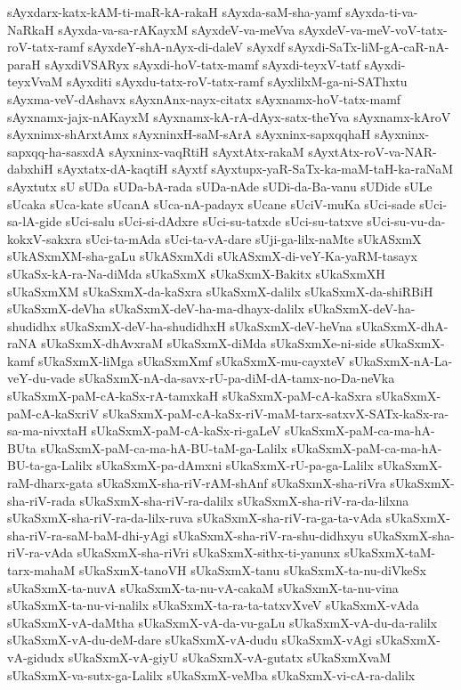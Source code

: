 {sAyxdarx-katx-kAM-ti-maR-kA-rakaH
sAyxda-saM-sha-yamf
sAyxda-ti-va-NaRkaH
sAyxda-va-sa-rAKayxM
sAyxdeV-va-meVva
sAyxdeV-va-meV-voV-tatx-roV-tatx-ramf
sAyxdeY-shA-nAyx-di-daleV
sAyxdf
sAyxdi-SaTx-liM-gA-caR-nA-paraH
sAyxdiVSARyx
sAyxdi-hoV-tatx-mamf
sAyxdi-teyxV-tatf
sAyxdi-teyxVvaM
sAyxditi
sAyxdu-tatx-roV-tatx-ramf
sAyxlilxM-ga-ni-SAThxtu
sAyxma-veV-dAshavx
sAyxnAnx-nayx-citatx
sAyxnamx-hoV-tatx-mamf
sAyxnamx-jajx-nAKayxM
sAyxnamx-kA-rA-dAyx-satx-theYva
sAyxnamx-kAroV
sAyxnimx-shArxtAmx
sAyxninxH-saM-sArA
sAyxninx-sapxqqhaH
sAyxninx-sapxqq-ha-sasxdA
sAyxninx-vaqRtiH
sAyxtAtx-rakaM
sAyxtAtx-roV-va-NAR-dabxhiH
sAyxtatx-dA-kaqtiH
sAyxtf
sAyxtupx-yaR-SaTx-ka-maM-taH-ka-raNaM
sAyxtutx
sU
sUDa
sUDa-bA-rada
sUDa-nAde
sUDi-da-Ba-vanu
sUDide
sULe
sUcaka
sUca-kate
sUcanA
sUca-nA-padayx
sUcane
sUciV-muKa
sUci-sade
sUci-sa-lA-gide
sUci-salu
sUci-si-dAdxre
sUci-su-tatxde
sUci-su-tatxve
sUci-su-vu-da-kokxV-sakxra
sUci-ta-mAda
sUci-ta-vA-dare
sUji-ga-lilx-naMte
sUkASxmX
sUkASxmXM-sha-gaLu
sUkASxmXdi
sUkASxmX-di-veY-Ka-yaRM-tasayx
sUkaSx-kA-ra-Na-diMda
sUkaSxmX
sUkaSxmX-Bakitx
sUkaSxmXH
sUkaSxmXM
sUkaSxmX-da-kaSxra
sUkaSxmX-dalilx
sUkaSxmX-da-shiRBiH
sUkaSxmX-deVha
sUkaSxmX-deV-ha-ma-dhayx-dalilx
sUkaSxmX-deV-ha-shudidhx
sUkaSxmX-deV-ha-shudidhxH
sUkaSxmX-deV-heVna
sUkaSxmX-dhA-raNA
sUkaSxmX-dhAvxraM
sUkaSxmX-diMda
sUkaSxmXe-ni-side
sUkaSxmX-kamf
sUkaSxmX-liMga
sUkaSxmXmf
sUkaSxmX-mu-cayxteV
sUkaSxmX-nA-La-veY-du-vade
sUkaSxmX-nA-da-savx-rU-pa-diM-dA-tamx-no-Da-neVka
sUkaSxmX-paM-cA-kaSx-rA-tamxkaH
sUkaSxmX-paM-cA-kaSxra
sUkaSxmX-paM-cA-kaSxriV
sUkaSxmX-paM-cA-kaSx-riV-maM-tarx-satxvX-SATx-kaSx-ra-sa-ma-nivxtaH
sUkaSxmX-paM-cA-kaSx-ri-gaLeV
sUkaSxmX-paM-ca-ma-hA-BUta
sUkaSxmX-paM-ca-ma-hA-BU-taM-ga-Lalilx
sUkaSxmX-paM-ca-ma-hA-BU-ta-ga-Lalilx
sUkaSxmX-pa-dAmxni
sUkaSxmX-rU-pa-ga-Lalilx
sUkaSxmX-raM-dharx-gata
sUkaSxmX-sha-riV-rAM-shAnf
sUkaSxmX-sha-riVra
sUkaSxmX-sha-riV-rada
sUkaSxmX-sha-riV-ra-dalilx
sUkaSxmX-sha-riV-ra-da-lilxna
sUkaSxmX-sha-riV-ra-da-lilx-ruva
sUkaSxmX-sha-riV-ra-ga-ta-vAda
sUkaSxmX-sha-riV-ra-saM-baM-dhi-yAgi
sUkaSxmX-sha-riV-ra-shu-didhxyu
sUkaSxmX-sha-riV-ra-vAda
sUkaSxmX-sha-riVri
sUkaSxmX-sithx-ti-yanunx
sUkaSxmX-taM-tarx-mahaM
sUkaSxmX-tanoVH
sUkaSxmX-tanu
sUkaSxmX-ta-nu-diVkeSx
sUkaSxmX-ta-nuvA
sUkaSxmX-ta-nu-vA-cakaM
sUkaSxmX-ta-nu-vina
sUkaSxmX-ta-nu-vi-nalilx
sUkaSxmX-ta-ra-ta-tatxvXveV
sUkaSxmX-vAda
sUkaSxmX-vA-daMtha
sUkaSxmX-vA-da-vu-gaLu
sUkaSxmX-vA-du-da-ralilx
sUkaSxmX-vA-du-deM-dare
sUkaSxmX-vA-dudu
sUkaSxmX-vAgi
sUkaSxmX-vA-gidudx
sUkaSxmX-vA-giyU
sUkaSxmX-vA-gutatx
sUkaSxmXvaM
sUkaSxmX-va-sutx-ga-Lalilx
sUkaSxmX-veMba
sUkaSxmX-vi-cA-ra-dalilx
}

